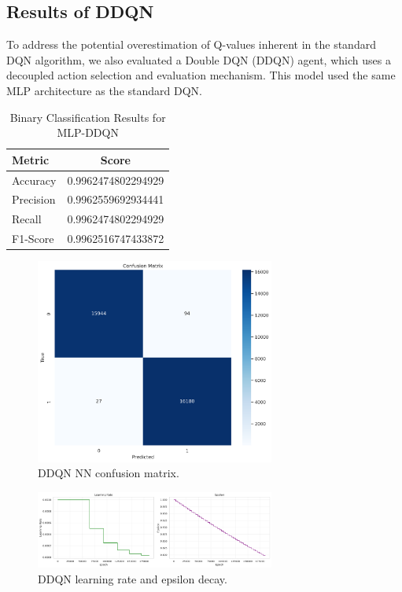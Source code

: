 \documentclass[16pt]{report}
\begin{document}
\subsection{Results of DDQN}
To address the potential overestimation of Q-values inherent in the standard DQN algorithm, we also evaluated a Double DQN (DDQN) agent, which uses a decoupled action selection and evaluation mechanism. This model used the same MLP architecture as the standard DQN.

\begin{table}[H]
    \centering
    \caption{Binary Classification Results for MLP-DDQN}
    \label{tab:binary_ddqn_results}
    \begin{tabular}{@{}lc@{}}
        \toprule
        \textbf{Metric} & \textbf{Score} \\
        \midrule
        Accuracy & 0.9962474802294929 \\
        Precision & 0.9962559692934441 \\
        Recall & 0.9962474802294929 \\
        F1-Score & 0.9962516747433872 \\
        \bottomrule
    \end{tabular}
\end{table}
\begin{figure}[htbp]
    \centering
    \includegraphics[width=0.7\textwidth]{images/double_dqn_nn_confusion_matrix.png}
    \caption{DDQN NN confusion matrix.}
    \label{fig:ddqn_confusion}
\end{figure}

\vspace{0.5cm}

\begin{figure}[htbp]
    \centering
    \includegraphics[width=0.7\textwidth]{images/double_dqn_nn_lr_epsilon.png}
    \caption{DDQN learning rate and epsilon decay.}
    \label{fig:ddqn_lr_epsilon}
\end{figure}
\end{document}
